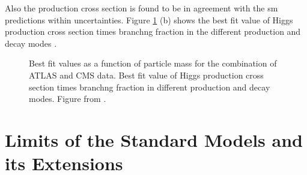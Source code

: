 Also the production cross section is found to be in agreement with the \gls{sm} predictions within uncertainties. Figure \ref{fig:sm:h_couplings_mass} (b) shows the best fit value of Higgs production cross section times branchng fraction in the different production and decay modes \cite{Khachatryan:2016vau}.

\begin{figure}[ht]
\centering
{}
\caption{ Best fit values as a function of particle mass for the combination of ATLAS and CMS data.  Best fit value of Higgs production cross section times branchng fraction in different production and decay modes. Figure from \cite{Khachatryan:2016vau}.}
\label{fig:sm:h_couplings_mass}
\end{figure}

 


\section{Limits of the Standard Models and its Extensions}
\label{sec:smsusy:bsm}

